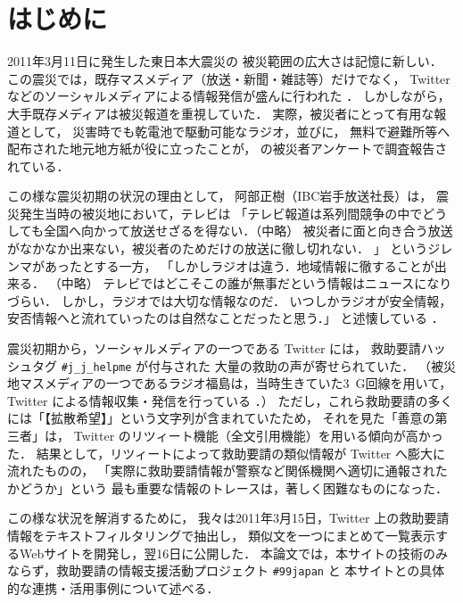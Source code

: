 \documentclass[japanese]{jnlp_1.4}
\begin{document}
\maketitle


\section{はじめに}  
2011年3月11日に発生した東日本大震災の
被災範囲の広大さは記憶に新しい．
この震災では，既存マスメディア（放送・新聞・雑誌等）だけでなく，
Twitter などのソーシャルメディアによる情報発信が盛んに行われた \cite{Shimbun,Endo2}． 
しかしながら，大手既存メディアは被災報道を重視していた．
実際，被災者にとって有用な報道として，
災害時でも乾電池で駆動可能なラジオ，並びに，
無料で避難所等へ配布された地元地方紙が役に立ったことが，
\cite{Fukuda}の被災者アンケートで調査報告されている． 


この様な震災初期の状況の理由として，
阿部正樹（IBC岩手放送社長）は，
震災発生当時の被災地において，テレビは
「テレビ報道は系列間競争の中でどうしても全国へ向かって放送せざるを得ない．（中略）
被災者に面と向き合う放送がなかなか出来ない，被災者のためだけの放送に徹し切れない．
」
というジレンマがあったとする一方，
「しかしラジオは違う．地域情報に徹することが出来る．
（中略）
テレビではどこそこの誰が無事だという情報はニュースになりづらい．
しかし，ラジオでは大切な情報なのだ．
いつしかラジオが安全情報，安否情報へと流れていったのは自然なことだったと思う．」
と述懐している \cite{IBC}． 

震災初期から，ソーシャルメディアの一つである Twitter には，
救助要請ハッシュタグ {\tt \#j\_j\_helpme}
\cite{Twitter_tags} が付与された 大量の救助の声が寄せられていた．
（被災地マスメディアの一つであるラジオ福島は，当時生きていた3~G回線を用いて，
Twitter による情報収集・発信を行っている \cite{rfc}．）
ただし，これら救助要請の多くには「【拡散希望】」という文字列が含まれていたため，
それを見た「善意の第三者」は， 
Twitter のリツィート機能（全文引用機能）を用いる傾向が高かった\cite{Ogiue,Tachiiri}．
結果として，リツィートによって救助要請の類似情報が Twitter へ膨大に流れたものの，
「実際に救助要請情報が警察など関係機関へ適切に通報されたかどうか」という
最も重要な情報のトレースは，著しく困難なものになった． 


この様な状況を解消するために，
我々は2011年3月15日，Twitter 上の救助要請情報をテキストフィルタリングで抽出し，
類似文を一つにまとめて一覧表示するWebサイトを開発し，翌16日に公開した\cite{Aida0,extraction,Aida1}．
本論文では，本サイトの技術のみならず，救助要請の情報支援活動プロジェクト {\tt \#99japan} と
本サイトとの具体的な連携・活用事例について述べる．
\end{document}
